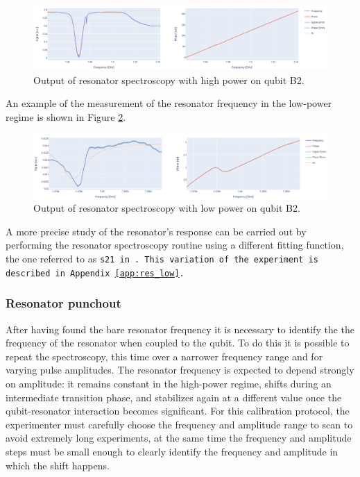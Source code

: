 \begin{figure}[h!]
    \centering
    \includegraphics[width=\textwidth]{figures/png/res_spectroscopy_high.png}
    \caption{Output of resonator spectroscopy with high power on qubit B2.}
    \label{fig:res_high}
\end{figure}

An example of the measurement of the resonator frequency in the low-power regime is shown in Figure \ref{fig:res_low}.

\begin{figure}[h!]
    \centering
    \includegraphics[width=\textwidth]{figures/png/res_low.png}
    \caption{Output of resonator spectroscopy with low power on qubit B2.}
    \label{fig:res_low}
\end{figure}

A more precise study of the resonator's response can be carried out by performing the resonator spectroscopy routine using a different fitting function, the one referred to as \tt{s21} in \Qibocal. 
This variation of the experiment is described in Appendix \ref{app:res_low}.

\subsubsection{Resonator punchout}
After having found the bare resonator frequency it is necessary to identify the the frequency of the resonator when coupled to the qubit. 
To do this it is possible to repeat the spectroscopy, this time over a narrower frequency range and for varying pulse amplitudes. 
The resonator frequency is expected to depend strongly on amplitude: it remains constant in the high-power regime, shifts during an intermediate transition phase, and stabilizes again at a different value once the qubit-resonator interaction becomes significant.
For this calibration protocol, the experimenter must carefully choose the frequency and amplitude range to scan to avoid extremely long experiments, at the same time the frequency and amplitude steps must be small enough to clearly identify the frequency and amplitude in which the shift happens.   

